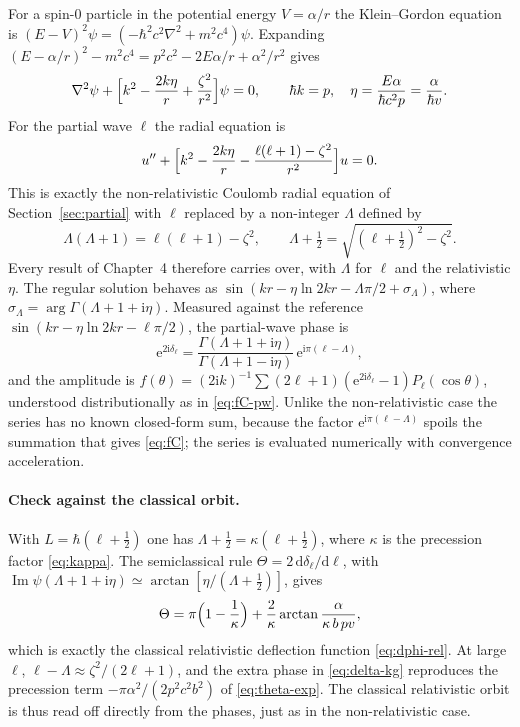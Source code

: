 \documentclass[11pt,a4paper]{book}
\numberwithin{equation}{chapter}
\newcommand{\dd}{\mathrm{d}}
\newcommand{\ii}{\mathrm{i}}
\newcommand{\ee}{\mathrm{e}}
\newcommand{\Imag}{\operatorname{Im}}
\begin{document}
For a spin-0 particle in the potential energy $V=\alpha/r$ the Klein--Gordon
equation is $(E-V)^2\psi=(-\hbar^2c^2\nabla^2+m^2c^4)\psi$. Expanding
$(E-\alpha/r)^2-m^2c^4=p^2c^2-2E\alpha/r+\alpha^2/r^2$ gives
\begin{equation}\label{eq:kg}
  \nabla^2\psi+\Bigl[k^2-\frac{2k\eta}{r}+\frac{\zeta^2}{r^2}\Bigr]\psi=0,
  \qquad \hbar k=p,\quad \eta=\frac{E\alpha}{\hbar c^2p}=\frac{\alpha}{\hbar v}.
\end{equation}
For the partial wave $\ell$ the radial equation is
\begin{equation}\label{eq:kg-rad}
  u''+\Bigl[k^2-\frac{2k\eta}{r}-\frac{\ell(\ell+1)-\zeta^2}{r^2}\Bigr]u=0 .
\end{equation}
This is exactly the non-relativistic Coulomb radial equation of
Section~\ref{sec:partial} with $\ell$ replaced by a non-integer $\Lambda$
defined by
\begin{equation}\label{eq:Lambda}
  \Lambda(\Lambda+1)=\ell(\ell+1)-\zeta^2,\qquad
  \Lambda+\tfrac12=\sqrt{(\ell+\tfrac12)^2-\zeta^2}.
\end{equation}
Every result of Chapter~4 therefore carries over, with $\Lambda$ for $\ell$ and
the relativistic $\eta$. The regular solution behaves as
$\sin(kr-\eta\ln2kr-\Lambda\pi/2+\sigma_\Lambda)$, where
$\sigma_\Lambda=\arg\Gamma(\Lambda+1+\ii\eta)$. Measured against the reference
$\sin(kr-\eta\ln2kr-\ell\pi/2)$, the partial-wave phase is
\begin{equation}\label{eq:delta-kg}
  \ee^{2\ii\delta_\ell}=\frac{\Gamma(\Lambda+1+\ii\eta)}{\Gamma(\Lambda+1-\ii\eta)}\,
  \ee^{\ii\pi(\ell-\Lambda)},
\end{equation}
and the amplitude is
$f(\theta)=(2\ii k)^{-1}\sum(2\ell+1)(\ee^{2\ii\delta_\ell}-1)P_\ell(\cos\theta)$,
understood distributionally as in \eqref{eq:fC-pw}. Unlike the non-relativistic
case the series has no known closed-form sum, because the factor
$\ee^{\ii\pi(\ell-\Lambda)}$ spoils the summation that gives \eqref{eq:fC}; the
series is evaluated numerically with convergence acceleration.

\paragraph{Check against the classical orbit.} With $L=\hbar(\ell+\tfrac12)$ one
has $\Lambda+\tfrac12=\kappa(\ell+\tfrac12)$, where $\kappa$ is the precession
factor \eqref{eq:kappa}. The semiclassical rule $\Theta=2\,\dd\delta_\ell/\dd\ell$,
with $\Imag\psi(\Lambda+1+\ii\eta)\simeq\arctan[\eta/(\Lambda+\tfrac12)]$, gives
\[
  \Theta=\pi\Bigl(1-\frac1\kappa\Bigr)+\frac2\kappa\arctan\frac{\alpha}{\kappa\,b\,pv},
\]
which is exactly the classical relativistic deflection function
\eqref{eq:dphi-rel}. At large $\ell$, $\ell-\Lambda\approx\zeta^2/(2\ell+1)$, and
the extra phase in \eqref{eq:delta-kg} reproduces the precession term
$-\pi\alpha^2/(2p^2c^2b^2)$ of \eqref{eq:theta-exp}. The classical relativistic
orbit is thus read off directly from the phases, just as in the non-relativistic
case.
\end{document}

